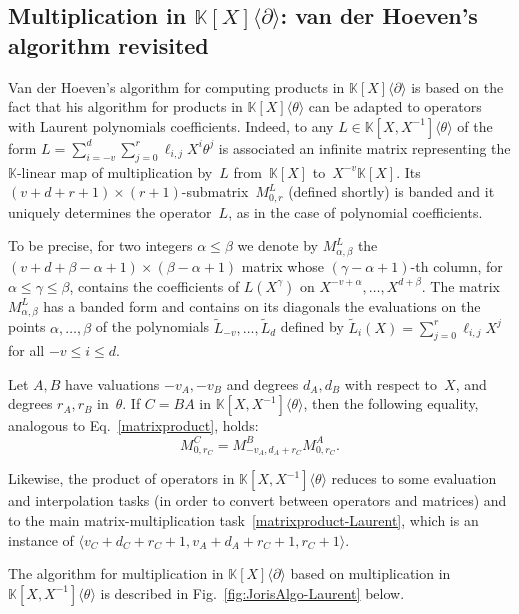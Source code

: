 \documentclass{sig-alt-full}
\newcommand{\x}{X}
\newcommand{\Tx}{\theta}
\newcommand{\Dx}{\partial}
\def\MMul#1#2#3{\langle #1,#2,#3 \rangle}
\newcommand{\bK}{\mathbb{K}}
\begin{document}
\subsection{Multiplication in $\bK[\x]\langle\Dx\rangle$: van der Hoeven's algorithm revisited}
\label{ssec:vdH_D}

Van der Hoeven's algorithm for computing products in $\bK[\x]\langle \Dx \rangle$ is based on the fact that his algorithm for products in $\bK[\x]\langle \Tx  \rangle$ can be adapted to operators with Laurent polynomials coefficients.
Indeed, to any  $L \in \bK[\x,\x^{-1}]\langle \Tx  \rangle$ of the form $L=\sum_{i=-v}^d \sum_{j=0}^r \ell_{i,j}\x^i \Tx^j$ is associated an infinite matrix representing the $\bK$-linear map of multiplication by~$L$ from~$\bK[\x]$ to~$\x^{-v}\bK[\x]$.
Its $(v+d+r+1) \times (r+1)$-submatrix~$M^L_{0,r}$ (defined shortly) is banded and it uniquely determines the operator~$L$, as in the case of polynomial coefficients.

To be precise, for  two integers $\alpha\leq\beta$ we denote by $M^L_{\alpha,\beta}$ the $(v+d+\beta-\alpha +1) \times (\beta - \alpha + 1)$ matrix whose $(\gamma-\alpha+1)$-th column,  for $\alpha\leq\gamma \leq \beta$,  contains the coefficients of $L(\x^\gamma)$ on $\x^{-v+\alpha},\ldots,\x^{d+\beta}$.
The matrix $M^L_{\alpha,\beta}$ has a banded form and contains on its diagonals the evaluations on the points $\alpha,\ldots, \beta$ of the polynomials $\tilde{L}_{-v},\ldots,\tilde{L}_d$ defined by $\tilde{L}_i(\x) = \sum_{j=0}^r \ell_{i,j}\x^j$ for all $-v \leq i \leq d$.

Let $A,B$ have valuations $-v_A,-v_B$ and degrees $d_A,d_B$ with respect to~$\x$, and degrees $r_A,r_B$ in~$\Tx$.
If $C=BA$  in $\bK[\x,\x^{-1}]\langle \Tx  \rangle$, then the  following equality, analogous to Eq.~\eqref{matrixproduct}, holds:
\begin{equation} \label{matrixproduct-Laurent}
M^C_{0,r_C} = M^B_{-v_A,d_A+r_C} M^A_{0,r_C}.
\end{equation}

Likewise, the product of operators in $\bK[\x,\x^{-1}]\langle \Tx  \rangle$ reduces to some evaluation and interpolation tasks (in order to convert between operators and matrices) and to the main matrix-multiplication task~\eqref{matrixproduct-Laurent}, which is an instance of $\MMul{v_C+d_C+r_C+1}{v_A+d_A+r_C+1}{r_C+1}$.

The algorithm for multiplication in $\bK[\x]\langle \Dx  \rangle$ based on multiplication in $\bK[\x,\x^{-1}]\langle \Tx  \rangle$ is described in Fig.~\ref{fig:JorisAlgo-Laurent} below.
\end{document}
